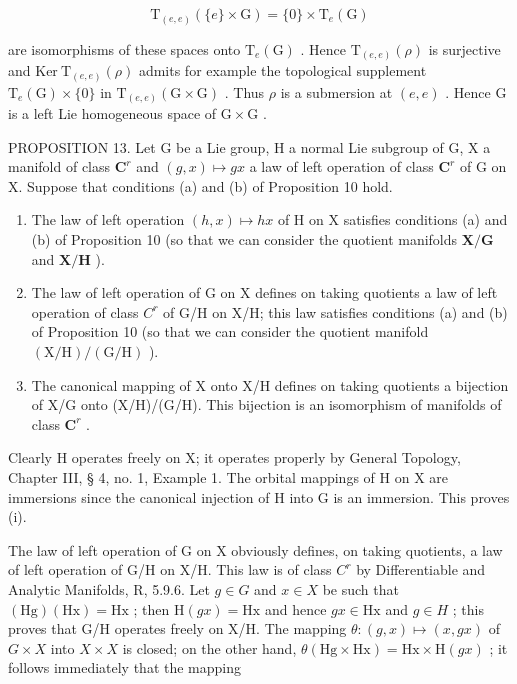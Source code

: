 \[
\mathrm{T} _ {(e, e)} (\{e \} \times \mathrm{G}) = \{0 \} \times \mathrm{T} _ {e} (\mathrm{G})
\]

are isomorphisms of these spaces onto \(\mathrm{T}_{e}(\mathrm{G})\) . Hence \(\mathrm{T}_{(e,e)}(\rho)\) is surjective and \(\mathrm{Ker~T}_{(e,e)}(\rho)\) admits for example the topological supplement \(\mathrm{T}_{e}(\mathrm{G}) \times \{0\}\) in \(\mathrm{T}_{(e,e)}(\mathrm{G} \times \mathrm{G})\) . Thus \(\rho\) is a submersion at \((e,e)\) . Hence G is a left Lie homogeneous space of \(\mathrm{G} \times \mathrm{G}\) .

PROPOSITION 13. Let G be a Lie group, H a normal Lie subgroup of G, X a manifold of class \(\mathbf{C}^r\) and \((g,x)\mapsto gx\) a law of left operation of class \(\mathbf{C}^r\) of G on X. Suppose that conditions (a) and (b) of Proposition 10 hold.

\begin{enumerate}
\def\labelenumi{(\roman{enumi})}
\item
  The law of left operation \((h, x) \mapsto hx\) of H on X satisfies conditions (a) and (b) of Proposition 10 (so that we can consider the quotient manifolds \(\mathbf{X} / \mathbf{G}\) and \(\mathbf{X} / \mathbf{H}\) ).
\item
  The law of left operation of G on X defines on taking quotients a law of left operation of class \(C^{r}\) of G/H on X/H; this law satisfies conditions (a) and (b) of Proposition 10 (so that we can consider the quotient manifold \((\mathrm{X}/\mathrm{H})/(\mathrm{G}/\mathrm{H})\) ).
\item
  The canonical mapping of X onto X/H defines on taking quotients a bijection of X/G onto (X/H)/(G/H). This bijection is an isomorphism of manifolds of class \(\mathbf{C}^r\) .
\end{enumerate}

Clearly H operates freely on X; it operates properly by General Topology, Chapter III, § 4, no. 1, Example 1. The orbital mappings of H on X are immersions since the canonical injection of H into G is an immersion. This proves (i).

The law of left operation of G on X obviously defines, on taking quotients, a law of left operation of G/H on X/H. This law is of class \(C^{r}\) by Differentiable and Analytic Manifolds, R, 5.9.6. Let \(g \in G\) and \(x \in X\) be such that \((\mathrm{Hg})(\mathrm{Hx}) = \mathrm{Hx}\) ; then \(\mathrm{H}(gx) = \mathrm{Hx}\) and hence \(gx \in \mathrm{Hx}\) and \(g \in H\) ; this proves that G/H operates freely on X/H. The mapping \(\theta: (g, x) \mapsto (x, gx)\) of \(G \times X\) into \(X \times X\) is closed; on the other hand, \(\theta(\mathrm{Hg} \times \mathrm{Hx}) = \mathrm{Hx} \times \mathrm{H}(gx)\) ; it follows immediately that the mapping

